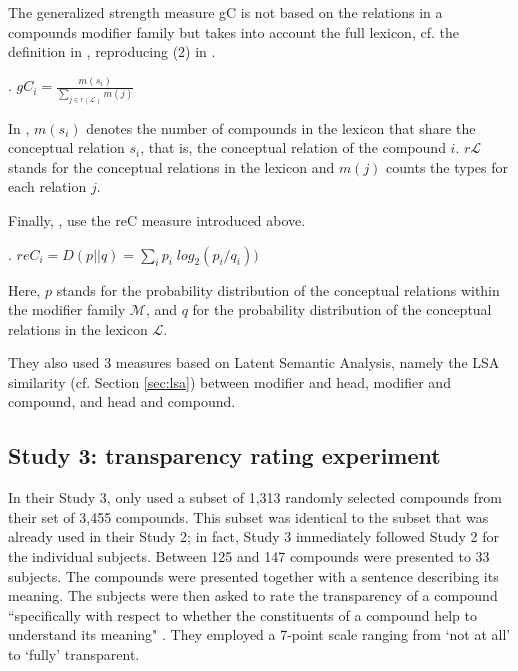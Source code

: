 The generalized strength measure gC is not based on the relations in a
compounds modifier family but takes into account the full lexicon,
cf. the definition in \Next, reproducing (2) in \citet[458]{PhamandBaayen:2013}.

\ex. \label{ex:generalized-strength-C}
\( \displaystyle gC_i = 
\frac{m(s_i)}{\sum_{j \in r(\mathcal{L})} m(j)} \)

In \Last, $m(s_i)$ denotes the number of compounds in the lexicon that
share the conceptual relation $s_i$, that is, the conceptual relation
of the compound $i$. $r\mathcal{L}$ stands for the conceptual relations in
the lexicon and $m(j)$ counts the types for each relation $j$. 

Finally, \citet{PhamandBaayen:2013}, use the reC measure introduced
above.


\ex. $reC_i = D(p||q) = \sum_i p_i \; log_2 (p_i/q_i))$

Here, $p$ stands for the probability distribution of the conceptual
relations within the modifier family $\mathcal{M}$, and $q$ for the
probability distribution of the conceptual relations in the lexicon $\mathcal{L}$.

They also used 3 measures based on Latent Semantic
Analysis, namely the LSA similarity (cf. Section \ref{sec:lsa}) between modifier and head,
modifier and compound, and head and compound. 


\subsection{Study 3: transparency rating experiment}
\label{sec:phambaayen3}

In their Study 3, \citet{PhamandBaayen:2013} only used a subset of 1,313 randomly selected compounds from
their set of 3,455 compounds. This subset was identical to the subset that was
already used in their Study 2; in fact, Study 3 immediately followed Study 2
for the individual subjects. Between 125 and 147 compounds were presented
to  33 subjects. The compounds were presented together with a sentence
describing its meaning. The subjects were then
asked to rate the transparency of a compound ``specifically with respect to whether the constituents of a compound
help to understand its meaning" \citep[467]{PhamandBaayen:2013}. They
employed a 7-point scale ranging from `not at all' to `fully' transparent. 

